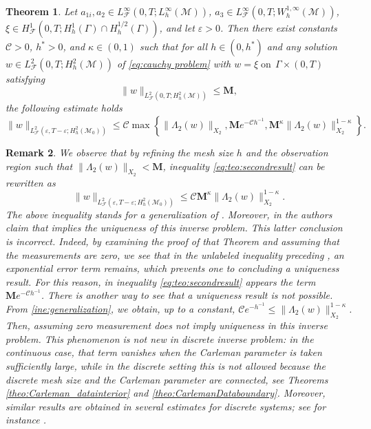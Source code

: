 \documentclass[11pt,oneside,leqno]{amsart}
\numberwithin{equation}{section}
\numberwithin{equation}{section}
\newtheorem{theorem}{Theorem}[section]
\newtheorem{remark}[theorem]{Remark}
\begin{document}
\begin{theorem}\label{Teo:SecondResult}
 Let $a_{1i},a_2\in L^\infty_{\mathcal{F}}(0,T;L_h^\infty(\mathcal{M}))$, $a_3 \in L^\infty_{\mathcal{F}}(0,T;W_h^{1,\infty}(\mathcal{M}))$, \break$\xi \in H^1_{\mathcal{F}}(0,T;H_h^1(\Gamma)\cap H_{h}^{1/2}(\Gamma))$, and let $\varepsilon > 0$. Then there exist constants $\mathcal{C} > 0$, $h^* > 0$, and $\kappa \in (0,1)$ such that for all $h \in (0, h^*)$ and any solution $w \in L^2_{\mathcal{F}}(0,T;H_h^2(\mathcal{M}))$ of \eqref{eq:cauchy problem} with $w=\xi\; \text{on}\;\, \Gamma\times (0,T)$ satisfying
\[
\|w\|_{L^2_{\mathcal{F}}(0,T;H_h^2(\mathcal{M}))} \leq \mathbf{M},
\]
the following estimate holds
\begin{equation}\label{eq:teo:secondresult}
\|w\|_{L^2_{\mathcal{F}}(\varepsilon,T-\varepsilon;H_h^2(\mathcal{M}_0))} \leq \mathcal{C} \max{\left\{\|\Lambda_2(w)\|_{X_2},\mathbf{M}e^{-\mathcal{C}h^{-1}},\mathbf{M}^{\kappa}\|\Lambda_2(w)\|_{X_2}^{1-\kappa}\right\}}.
\end{equation}
\end{theorem}
{ 
\begin{remark}\label{remark:nonuniquess} We observe that by refining the mesh size $h$ and the observation region such that $\|\Lambda_2(w)\|_{X_2}<\mathbf{M}$,  inequality \eqref{eq:teo:secondresult} can be rewritten as
\begin{equation}\label{ine:generalization}
   \|w\|_{L^2_{\mathcal{F}}(\varepsilon,T-\varepsilon;H_h^2(\mathcal{M}_0))} \leq \mathcal{C} \mathbf{M}^{\kappa}\|\Lambda_2(w)\|_{X_2}^{1-\kappa}.
\end{equation}
The above inequality stands for a generalization of \cite[Theorem 2.6]{WWW:2024}. Moreover, in \cite[Remark 2.11]{WWW:2024} the authors claim that \cite[Theorem 2.6]{WWW:2024} implies the uniqueness of this inverse problem. This latter conclusion is incorrect. Indeed, by examining the proof of that Theorem  and assuming that the measurements are zero, we see that in the unlabeled inequality preceding \cite[Inequality 5.16]{WWW:2024}, an exponential error term remains, which prevents one to concluding a uniqueness result. For this reason, in inequality \eqref{eq:teo:secondresult} appears the term $\mathbf{M}e^{-\mathcal{C}h^{-1}}$. There is another way to see that a uniqueness result is not possible. From \eqref{ine:generalization}, we obtain, up to a constant, $\mathcal{C}e^{-h^{-1}}\leq \|\Lambda_{2}(w)\|^{1-\kappa}_{X_{2}}$. Then, assuming zero measurement does not imply uniqueness in this inverse problem. This phenomenon is not new in discrete inverse problem: in the continuous case, that term vanishes when the Carleman parameter is taken sufficiently large, while in the discrete setting this is not allowed because the discrete mesh size and the Carleman parameter are connected, see Theorems \ref{theo:Carleman_datainterior} and \ref{theo:CarlemanDataboundary}. Moreover, similar results are obtained in several estimates for discrete systems; see for instance \cite{EDG:2011,LOPD:2023}.
 \end{remark}}
\end{document}
